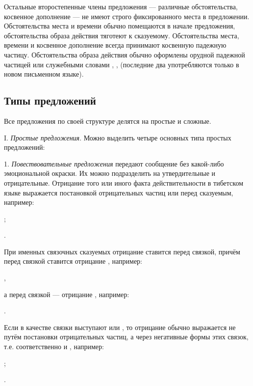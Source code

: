Остальные второстепенные члены предложения --- различные обстоятельства, косвенное дополнение --- не имеют строго фиксированного места в предложении. Обстоятельства места и времени обычно помещаются в начале предложения, обстоятельства образа действия тяготеют к сказуемому. Обстоятельства места, времени и косвенное дополнение всегда принимают косвенную падежную частицу.
Обстоятельства образа действия обычно оформлены орудной падежной частицей или служебными словами , ,  (последние два употребляются только в новом письменном языке).

\subsection{Типы предложений}

Все предложения по своей структуре делятся на простые и сложные.

I. \emph{Простые предложения}. Можно выделить четыре основных типа простых предложений:

1. \emph{Повествовательные предложения} передают сообщение без какой-либо эмоциональной окраски. Их можно подразделить на утвердительные и отрицательные. Отрицание того или иного факта действительности в тибетском языке выражается постановкой отрицательных частиц  или  перед сказуемым, например:
\begin{prfsample}
	\item {};
	\item {}.
\end{prfsample}
При именных связочных сказуемых отрицание ставится перед связкой, причём перед связкой
 ставится отрицание , например:
\begin{prfsample}
	\item {},
\end{prfsample}
а перед связкой	 --- отрицание , например:
\begin{prfsample}
	\item {}.	
\end{prfsample}
Если в качестве связки выступают  или , то отрицание обычно выражается не путём постановки отрицательных частиц, а через негативные формы этих связок, т.е. соответственно  и ,
например:
\begin{prfsample}
	\item {};
	\item {}.
\end{prfsample}

